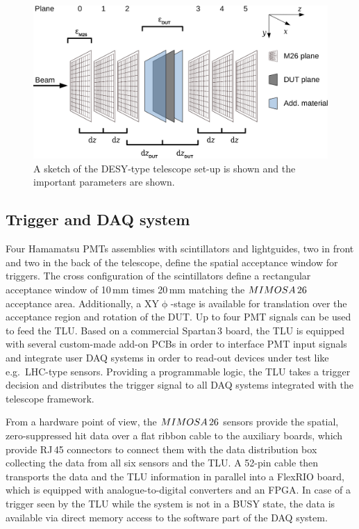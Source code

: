 \begin{figure}[tb]
	\center
	\includegraphics[width=.9\textwidth]{figures/sketch_tscope4}
	\caption[A sketch of the DESY-type telescope set-up]{A sketch of the DESY-type telescope set-up is shown and the important parameters are shown.}
	\label{fig:datura_sketch}
\end{figure}

\subsection{Trigger and DAQ system}

Four Hamamatsu PMTs assemblies with scintillators and lightguides, two in front and two in the back of the telescope, define the spatial acceptance window for triggers. 
The cross configuration of the scintillators define a rectangular acceptance window of 10\,mm times 20\,mm matching the $MIMOSA\,26$ acceptance area. 
Additionally, a XY$\upphi$-stage is available for translation over the acceptance region and rotation of the DUT. 
Up to four PMT signals can be used to feed the TLU. 
Based on a commercial Spartan\,3 board, the TLU is equipped with several custom-made add-on PCBs in order to interface PMT input signals
 and integrate user DAQ systems in order to read-out devices under test like e.g.~LHC-type sensors. 
Providing a programmable logic, the TLU  takes a trigger decision and distributes the trigger signal to all DAQ systems integrated with the telescope framework.

From a hardware point of view, the $MIMOSA\,26$ sensors provide the spatial, zero-suppressed hit data over a flat ribbon cable to the auxiliary boards, which provide RJ\,45 connectors to connect them with the
 data distribution box collecting the data from all six sensors and the TLU. 
A 52-pin cable then transports the data and the TLU information in parallel into a FlexRIO board, which is equipped with analogue-to-digital converters and an FPGA. 
In case of a trigger seen by the TLU while the system is not in a BUSY state, the data is available via direct memory access to the software part of the DAQ system. 

